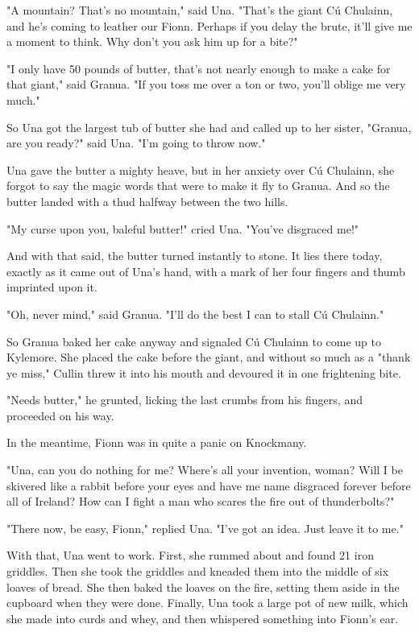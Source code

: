 "A mountain? That's no mountain," said Una. "That's the giant Cú Chulainn, and he's coming to leather our Fionn. Perhaps if you delay the brute, it'll give me a moment to think. Why don't you ask him up for a bite?"

"I only have 50 pounds of butter, that's not nearly enough to make a cake for that giant," said Granua. "If you toss me over a ton or two, you'll oblige me very much."

So Una got the largest tub of butter she had and called up to her sister, "Granua, are you ready?" said Una. "I'm going to throw now."

Una gave the butter a mighty heave, but in her anxiety over Cú Chulainn, she forgot to say the magic words that were to make it fly to Granua. And so the butter landed with a thud halfway between the two hills.

"My curse upon you, baleful butter!" cried Una. "You've disgraced me!"

And with that said, the butter turned instantly to stone. It lies there today, exactly as it came out of Una's hand, with a mark of her four fingers and thumb imprinted upon it.

"Oh, never mind," said Granua. "I'll do the best I can to stall Cú Chulainn."

So Granua baked her cake anyway and signaled Cú Chulainn to come up to Kylemore. She placed the cake before the giant, and without so much as a "thank ye miss," Cullin threw it into his mouth and devoured it in one frightening bite.

"Needs butter," he grunted, licking the last crumbs from his fingers, and proceeded on his way.

In the meantime, Fionn was in quite a panic on Knockmany.

"Una, can you do nothing for me? Where's all your invention, woman? Will I be skivered like a rabbit before your eyes and have me name disgraced forever before all of Ireland? How can I fight a man who scares the fire out of thunderbolts?"

"There now, be easy, Fionn," replied Una. "I've got an idea. Just leave it to me."

With that, Una went to work. First, she rummed about and found 21 iron griddles. Then she took the griddles and kneaded them into the middle of six loaves of bread. She then baked the loaves on the fire, setting them aside in the cupboard when they were done. Finally, Una took a large pot of new milk, which she made into curds and whey, and then whispered something into Fionn's ear.

